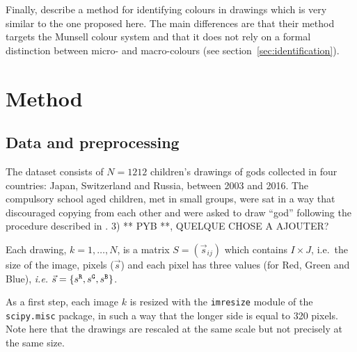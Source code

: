 \documentclass[11pt,a4paper]{article}
\begin{document}
Finally, \citet{kimbaelee2007} describe a method for identifying colours in drawings which is very similar to the one proposed here. The main differences are that their method targets the Munsell colour system \cite{Munsell1912} and that it does not rely on a formal distinction between micro- and macro-colours (see section~\ref{sec:identification}).



\section{Method}\label{methods}
\label{sec:method}


\subsection{Data and preprocessing}
\label{sec:dataset_preprocessing}

The dataset consists of $N = 1212$ children's drawings of gods collected in four countries: Japan, Switzerland and Russia, between 2003 and 2016. The compulsory school aged children, met in small groups, were sat in a way that discouraged copying from each other and were asked to draw ``god'' following the procedure described in \citet{DandarovaRobertDessartSerbaevaEtAl2016}.
{\color{red} 3) ** PYB **, QUELQUE CHOSE A AJOUTER?}

Each drawing, $k = 1,\dots, N$, is a matrix $S = (\vec{s}_{ij})$ which contains $I \times J$, i.e.~the size of the image,
pixels ($\vec{s}$) and each pixel has three values (for Red, Green and Blue), \textit{i.e.}
$\vec{s} = \{ s^{\tt \scriptstyle R}, s^{\tt \scriptstyle G}, s^{\tt \scriptstyle B} \}$.

As a first step, each image $k$ is resized with the {\tt imresize}
module of the {\tt scipy.misc} package, in such a way that the longer side is
equal to 320 pixels. Note here that the drawings are
rescaled at the same scale but not precisely at the same size.
\end{document}
